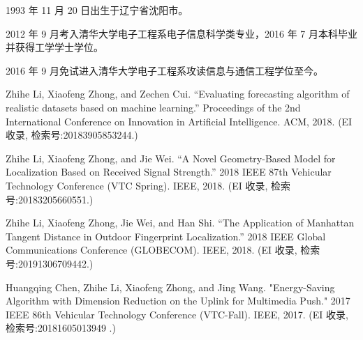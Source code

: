 \begin{resume}


  1993 年 11 月 20 日出生于辽宁省沈阳市。

  2012 年 9 月考入清华大学电子工程系电子信息科学类专业，2016 年 7 月本科毕业并获得工学学士学位。

  2016 年 9 月免试进入清华大学电子工程系攻读信息与通信工程学位至今。


  \begin{publications}
    \item Zhihe Li, Xiaofeng Zhong, and Zechen Cui. “Evaluating forecasting algorithm of realistic datasets based on machine learning.” Proceedings of the 2nd International Conference on Innovation in Artificial Intelligence. ACM, 2018. (EI 收录, 检索号:20183905853244.)
    \item Zhihe Li, Xiaofeng Zhong, and Jie Wei. “A Novel Geometry-Based Model for Localization Based on Received Signal Strength.” 2018 IEEE 87th Vehicular Technology Conference (VTC Spring). IEEE, 2018. (EI 收录, 检索号:20183205660551.)
    \item Zhihe Li, Xiaofeng Zhong, Jie Wei, and Han Shi. “The Application of Manhattan Tangent Distance in Outdoor Fingerprint Localization.” 2018 IEEE Global Communications Conference (GLOBECOM). IEEE, 2018. (EI 收录, 检索号:20191306709442.)
  \end{publications}

    

  \begin{publications}
    \item Huangqing Chen, Zhihe Li, Xiaofeng Zhong, and Jing Wang. "Energy-Saving Algorithm with Dimension Reduction on the Uplink for Multimedia Push." 2017 IEEE 86th Vehicular Technology Conference (VTC-Fall). IEEE, 2017. (EI 收录, 检索号:20181605013949 .)
  \end{publications}

    

\end{resume}
